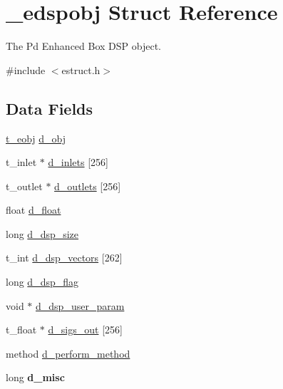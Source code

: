 \hypertarget{struct__edspobj}{\section{\-\_\-edspobj Struct Reference}
\label{struct__edspobj}
}


The Pd Enhanced Box D\-S\-P object.  




{\ttfamily \#include $<$estruct.\-h$>$}

\subsection*{Data Fields}
\begin{DoxyCompactItemize}
\item 
\hyperlink{struct__eobj}{t\-\_\-eobj} \hyperlink{struct__edspobj_a987087c8b9df0fa2ae99bd44ab53dab9}{d\-\_\-obj}
\item 
t\-\_\-inlet $\ast$ \hyperlink{struct__edspobj_af58ea0594fc028861443f36dc2d1ebf4}{d\-\_\-inlets} \mbox{[}256\mbox{]}
\item 
t\-\_\-outlet $\ast$ \hyperlink{struct__edspobj_a529a1e3597eb3ee79f6cabef51f41ef9}{d\-\_\-outlets} \mbox{[}256\mbox{]}
\item 
float \hyperlink{struct__edspobj_aaa8c8ad1277112523fd01b5058e0fcb5}{d\-\_\-float}
\item 
long \hyperlink{struct__edspobj_a0bb016ebe02ce3d3a0965a19c1d8476d}{d\-\_\-dsp\-\_\-size}
\item 
t\-\_\-int \hyperlink{struct__edspobj_a6c9361ef0820022b61cd7894d641c029}{d\-\_\-dsp\-\_\-vectors} \mbox{[}262\mbox{]}
\item 
long \hyperlink{struct__edspobj_af3409f354253e5753dbba6b22472972e}{d\-\_\-dsp\-\_\-flag}
\item 
void $\ast$ \hyperlink{struct__edspobj_ab056760f93f95b4edc3a8dddd0b5b62f}{d\-\_\-dsp\-\_\-user\-\_\-param}
\item 
t\-\_\-float $\ast$ \hyperlink{struct__edspobj_aebb3e36050cca90ec2bbfc8226198ca8}{d\-\_\-sigs\-\_\-out} \mbox{[}256\mbox{]}
\item 
method \hyperlink{struct__edspobj_ae13acca7c0f073f1030545ce368e6e03}{d\-\_\-perform\-\_\-method}
\item 
\hypertarget{struct__edspobj_a4c692fd24facbf12d763b7f8d813c266}{long {\bfseries d\-\_\-misc}}\label{struct__edspobj_a4c692fd24facbf12d763b7f8d813c266}

\end{DoxyCompactItemize}


